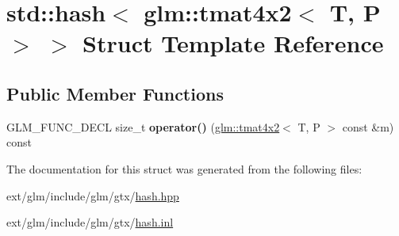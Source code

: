 \hypertarget{structstd_1_1hash_3_01glm_1_1tmat4x2_3_01_t_00_01_p_01_4_01_4}{\section{std\-:\-:hash$<$ glm\-:\-:tmat4x2$<$ T, P $>$ $>$ Struct Template Reference}
\label{structstd_1_1hash_3_01glm_1_1tmat4x2_3_01_t_00_01_p_01_4_01_4}
}
\subsection*{Public Member Functions}
\begin{DoxyCompactItemize}
\item 
\hypertarget{structstd_1_1hash_3_01glm_1_1tmat4x2_3_01_t_00_01_p_01_4_01_4_a4f551467d5b8a7453cc392d6ad3c2a8e}{G\-L\-M\-\_\-\-F\-U\-N\-C\-\_\-\-D\-E\-C\-L size\-\_\-t {\bfseries operator()} (\hyperlink{structglm_1_1tmat4x2}{glm\-::tmat4x2}$<$ T, P $>$ const \&m) const }\label{structstd_1_1hash_3_01glm_1_1tmat4x2_3_01_t_00_01_p_01_4_01_4_a4f551467d5b8a7453cc392d6ad3c2a8e}

\end{DoxyCompactItemize}


The documentation for this struct was generated from the following files\-:\begin{DoxyCompactItemize}
\item 
ext/glm/include/glm/gtx/\hyperlink{hash_8hpp}{hash.\-hpp}\item 
ext/glm/include/glm/gtx/\hyperlink{hash_8inl}{hash.\-inl}\end{DoxyCompactItemize}

